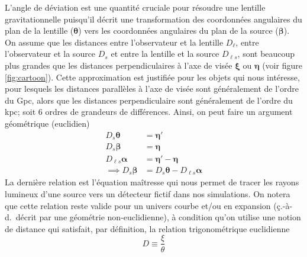 L'angle de déviation est une quantité cruciale pour résoudre une lentille gravitationnelle 
puisqu'il décrit une transformation des coordonnées angulaires du plan de la lentille ($\boldsymbol{ \theta} $) 
vers les coordonnées angulaires du plan de la source ($\boldsymbol{ \beta} $). 
On assume que les distances entre l'observateur et la lentille $D_{\ell}$, entre l'observateur et la source $D_s$ et entre la lentille et la source $D_{\ell s}$, 
sont beaucoup plus grandes que les distances perpendiculaires à l'axe de visée $\boldsymbol{ \xi} $ ou $\boldsymbol{ \eta}$ 
(voir figure \ref{fig:cartoon}). 
Cette approximation est justifiée pour les objets qui nous intéresse,
pour lesquels les distances parallèles à l'axe de visée sont généralement 
de l'ordre du Gpc, alors que les distances perpendiculaire sont généralement 
de l'ordre du kpc; soit 6 ordres de grandeurs de différences.
Ainsi, on peut faire un argument géométrique (euclidien) 
\begin{align}
\nonumber
       D_{s} \boldsymbol{ \theta} &= \boldsymbol{ \eta}' \\   
\nonumber
       D_{s} \boldsymbol{ \beta} &= \boldsymbol{ \eta} \\   
\nonumber
       D_{\ell s} \boldsymbol{ \alpha} &= \boldsymbol{ \eta}' - \boldsymbol{ \eta}  \\   
\label{eq:lens equation}
       \implies D_s \boldsymbol{ \beta} &= D_s \boldsymbol{ \theta} - D_{\ell s} \boldsymbol{ \alpha}   
\end{align} 
La dernière relation est l'équation maîtresse qui nous permet de tracer les rayons lumineux d'une source 
vers un détecteur fictif dans nos simulations. On notera que cette relation reste valide pour un univers courbe et/ou en expansion 
(ç.-à-d.\ décrit par une géométrie non-euclidienne), 
à condition qu'on utilise une notion de distance qui satisfait, par définition, la relation trigonométrique euclidienne
\begin{equation}\label{eq:diameter angular distance}
       D \equiv \frac{\xi}{\theta}
\end{equation} 

